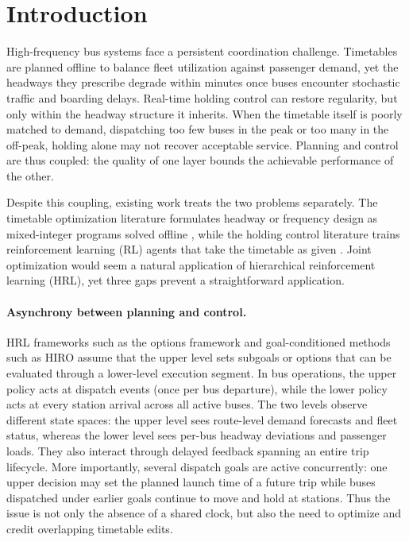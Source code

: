 \section{Introduction}
\label{sec:intro}

High-frequency bus systems face a persistent coordination challenge.
Timetables are planned offline to balance fleet utilization against passenger demand, yet the headways they prescribe degrade within minutes once buses encounter stochastic traffic and boarding delays.
Real-time holding control can restore regularity, but only within the headway structure it inherits.
When the timetable itself is poorly matched to demand, dispatching too few buses in the peak or too many in the off-peak, holding alone may not recover acceptable service.
Planning and control are thus coupled: the quality of one layer bounds the achievable performance of the other.

Despite this coupling, existing work treats the two problems separately.
The timetable optimization literature formulates headway or frequency design as mixed-integer programs solved offline \citep{gkiotsalitis2021bus}, while the holding control literature trains reinforcement learning (RL) agents that take the timetable as given \citep{wang2020real,zhang2026single}.
Joint optimization would seem a natural application of hierarchical reinforcement learning (HRL), yet three gaps prevent a straightforward application.

\paragraph{Asynchrony between planning and control.}
HRL frameworks such as the options framework \citep{sutton1999between} and goal-conditioned methods such as HIRO \citep{nachum2018data} assume that the upper level sets subgoals or options that can be evaluated through a lower-level execution segment.
In bus operations, the upper policy acts at dispatch events (once per bus departure), while the lower policy acts at every station arrival across all active buses.
The two levels observe different state spaces: the upper level sees route-level demand forecasts and fleet status, whereas the lower level sees per-bus headway deviations and passenger loads.
They also interact through delayed feedback spanning an entire trip lifecycle.
More importantly, several dispatch goals are active concurrently: one upper decision may set the planned launch time of a future trip while buses dispatched under earlier goals continue to move and hold at stations.
Thus the issue is not only the absence of a shared clock, but also the need to optimize and credit overlapping timetable edits.

